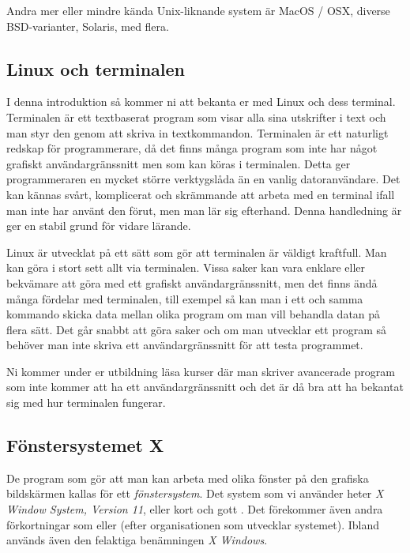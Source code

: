 \documentclass[a4paper,twocolumn]{book}
\begin{document}
Andra mer eller mindre kända Unix-liknande system är MacOS / OSX, diverse BSD-varianter,
Solaris, med flera.

\subsection{Linux och terminalen}

I denna introduktion så kommer ni att bekanta er med Linux och dess terminal.
Terminalen är ett textbaserat program som visar alla sina utskrifter i text
och man styr den genom att skriva in textkommandon. 
Terminalen är ett naturligt redskap för programmerare, då det finns många program
som inte har något grafiskt användargränssnitt men som kan köras i terminalen. Detta ger programmeraren en mycket större verktygslåda än en vanlig datoranvändare. 
Det kan kännas svårt, komplicerat och skrämmande att arbeta med en terminal ifall man inte har använt den förut, men man lär sig efterhand. Denna handledning är ger en stabil grund för vidare lärande.

Linux är utvecklat på ett sätt som gör att terminalen är väldigt kraftfull.
Man kan göra i stort sett allt via terminalen. Vissa saker kan vara enklare 
eller bekvämare att göra med ett grafiskt användargränssnitt, men det finns ändå
många fördelar med terminalen, till exempel så kan man i ett och samma kommando skicka data
mellan olika program om man vill behandla datan på flera sätt. Det går snabbt att
göra saker och om man utvecklar ett program så behöver man inte skriva ett 
användargränssnitt för att testa programmet.

Ni kommer under er utbildning läsa kurser där man skriver avancerade program som
inte kommer att ha ett användargränssnitt och det är då bra att ha bekantat sig
med hur terminalen fungerar.

\subsection{Fönstersystemet X}

De program som gör att man kan arbeta med olika fönster på den
grafiska bildskärmen kallas för ett \emph{fönstersystem}. Det system
som vi använder heter \emph{X Window System, Version 11},
eller kort och gott . Det förekommer även andra
förkortningar som  eller  (efter organisationen
som utvecklar systemet). Ibland används
även den felaktiga benämningen \emph{X Windows}.
\end{document}
